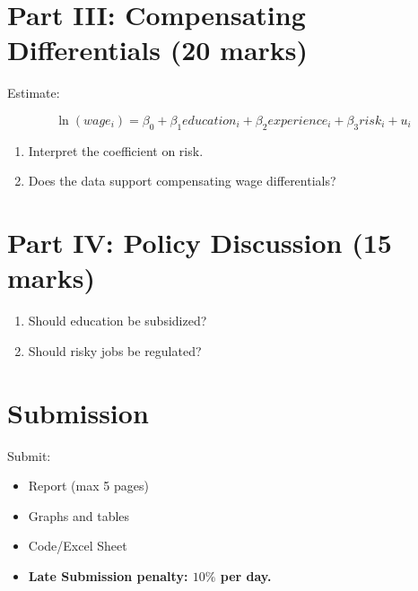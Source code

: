\documentclass[12pt]{article}
\begin{document}
\section*{Part III: Compensating Differentials (20 marks)}

Estimate:

\[
\ln(wage_i) = \beta_0 + \beta_1 education_i + \beta_2 experience_i + \beta_3 risk_i + u_i
\]

\begin{enumerate}
    \item Interpret the coefficient on risk.
    \item Does the data support compensating wage differentials?
\end{enumerate}



\section*{Part IV: Policy Discussion (15 marks)}

\begin{enumerate}
    \item Should education be subsidized?
    \item Should risky jobs be regulated?
\end{enumerate}

\section*{Submission}

Submit:
\begin{itemize}
    \item Report (max 5 pages)
    \item Graphs and tables
    \item Code/Excel Sheet 
    \item\textbf{ Late Submission penalty: $10\%$ per day.}
\end{itemize}
\end{document}
